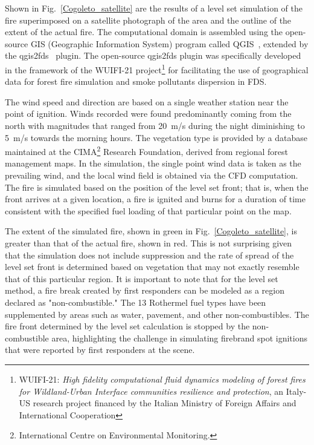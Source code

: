 \documentclass[journal,article,atmosphere,submit,moreauthors,pdftex]{Definitions/mdpi}
\begin{document}
Shown in Fig.~\ref{Cogoleto_satellite} are the results of a level set simulation of the fire superimposed on a satellite photograph of the area and the outline of the extent of the actual fire. The computational domain is assembled using the open-source GIS (Geographic Information System) program called QGIS~\cite{QGIS}, extended by the qgis2fds~\cite{qgis2fds} plugin. The open-source qgis2fds plugin was specifically developed in the framework of the WUIFI-21 project\footnote{WUIFI-21: {\it High fidelity computational fluid dynamics modeling of forest fires for Wildland-Urban Interface communities resilience and protection}, an Italy-US research project financed by the Italian Ministry of Foreign Affairs and International Cooperation} for facilitating the use of geographical data for forest fire simulation and smoke pollutants dispersion in FDS.

The wind speed and direction are based on a single weather station near the point of ignition. Winds recorded were found predominantly coming from the north with magnitudes that ranged from 20~m/s during the night diminishing to 5~m/s towards the morning hours. The vegetation type is provided by a database maintained at the CIMA\footnote{International Centre on Environmental Monitoring.} Research Foundation, derived from regional forest management maps. In the simulation, the single point wind data is taken as the prevailing wind, and the local wind field is obtained via the CFD computation. The fire is simulated based on the position of the level set front; that is, when the front arrives at a given location, a fire is ignited and burns for a duration of time consistent with the specified fuel loading of that particular point on the map. 

The extent of the simulated fire, shown in green in Fig.~\ref{Cogoleto_satellite}, is greater than that of the actual fire, shown in red. This is not surprising given that the simulation does not include suppression and the rate of spread of the level set front is determined based on vegetation that may not exactly resemble that of this particular region. It is important to note that for the level set method, a fire break created by first responders can be modeled as a region declared as "non-combustible." The 13 Rothermel fuel types have been supplemented by areas such as water, pavement, and other non-combustibles. The fire front determined by the level set calculation is stopped by the non-combustible area, highlighting the challenge in simulating firebrand spot ignitions that were reported by first responders at the scene.
\end{document}
